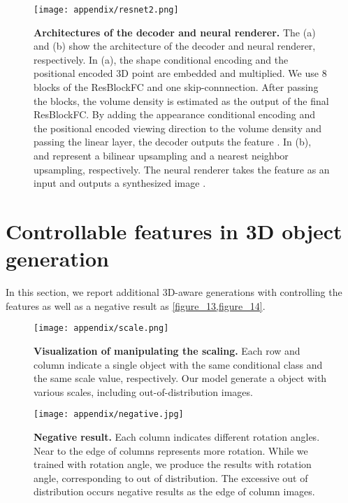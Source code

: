 \documentclass[nohyperref]{article}
\theoremstyle{plain}
\theoremstyle{definition}
\theoremstyle{remark}
\begin{document}
\begin{figure}[h]
\begin{center}
\centerline{\texttt{[image: appendix/resnet2.png]}}
\caption{\textbf{Architectures of the decoder and neural renderer.} The (a) and (b) show the architecture of the decoder and neural renderer, respectively. In (a), the shape conditional encoding  and the positional encoded 3D point  are embedded and multiplied. We use 8 blocks of the ResBlockFC and one skip-connnection. After passing the blocks, the volume density  is estimated as the output of the final ResBlockFC. By adding the appearance conditional encoding  and the positional encoded viewing direction  to the volume density and passing the linear layer, the decoder outputs the feature . In (b),  and  represent a bilinear upsampling and a nearest neighbor upsampling, respectively. The neural renderer takes the feature  as an input and outputs a synthesized image .}
\label{figure_12}
\end{center}
\vskip -0.2in
\end{figure}
\clearpage
\newpage

\section{Controllable features in 3D object generation}
In this section, we report additional 3D-aware generations with controlling the features as well as a negative result as \cref{figure_13,figure_14}.


\begin{figure}[h]
\begin{center}
\centerline{\texttt{[image: appendix/scale.png]}}
\caption{\textbf{Visualization of manipulating the scaling.} Each row and column indicate a single object with the same conditional class and the same scale value, respectively. Our model generate a object with various scales, including out-of-distribution images.}
\label{figure_13}
\end{center}
\vskip -0.2in
\end{figure}




\begin{figure}[h]
\begin{center}
\centerline{\texttt{[image: appendix/negative.jpg]}}
\caption{\textbf{Negative result.} Each column indicates different rotation angles. Near to the edge of columns represents more rotation. While we trained with  rotation angle, we produce the results with  rotation angle, corresponding to out of distribution. The excessive out of distribution occurs negative results as the edge of column images.}
\label{figure_14}
\end{center}
\vskip -0.2in
\end{figure}
\clearpage
\newpage
\end{document}
